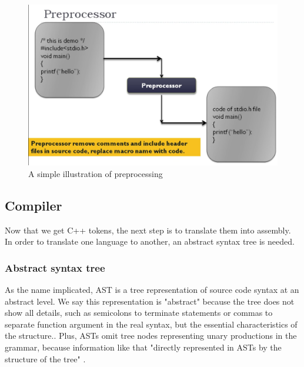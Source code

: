         \begin{figure}
            \centering
            \includegraphics[scale = 0.25]
            {Images/concepts/Preprocessor.png}
            \caption[A simple illustration of preprocessing]%
            {A simple illustration of preprocessing\footnotemark}    \label{fig:Preprocessor}
        \end{figure}

            
    
    
    
    \subsection{Compiler}
        Now that we get C++ tokens, the next step is to translate them into assembly. In order to translate one language to another, an abstract syntax tree is needed.  
        
        \subsubsection{Abstract syntax tree}
                    
            As the name implicated, AST is a tree representation of source code syntax at an abstract level. We say this representation is "abstract" because the tree does not show all details, such as semicolons to terminate statements or commas to separate function argument in the real syntax, but the essential characteristics of the structure.\cite {Joel-Jones-03}. Plus, ASTs omit tree nodes representing unary productions in the grammar, because information like that 
    "directly represented in ASTs by the structure of the tree"
    \cite {Joel-Jones-03}.
             
